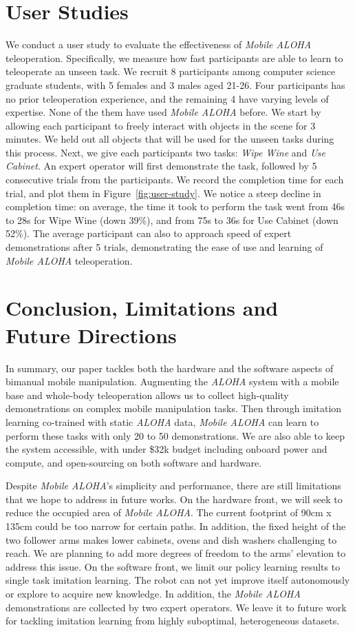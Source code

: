 \documentclass[11pt, a4paper, logo, twocolumn]{stanford}
\newcommand{\method}{\textit{Mobile ALOHA} }
\newcommand{\methodcomma}{\textit{Mobile ALOHA}}
\newcommand{\aloha}{\textit{ALOHA} }
\begin{document}
\section{User Studies}
We conduct a user study to evaluate the effectiveness of \method teleoperation. Specifically, we measure how fast participants are able to learn to teleoperate an unseen task.
We recruit 8 participants among computer science graduate students, with 5 females and 3 males aged 21-26. Four participants has no prior teleoperation experience, and the remaining 4 have varying levels of expertise. None of the them have used \method before.
We start by allowing each participant to freely interact with objects in the scene for 3 minutes. We held out all objects that will be used for the unseen tasks during this process.
Next, we give each participants two tasks: \textit{Wipe Wine} and \textit{Use Cabinet}. An expert operator will first demonstrate the task, followed by 5 consecutive trials from the participants. We record the completion time for each trial, and plot them in Figure~\ref{fig:user-study}.
We notice a steep decline in completion time: on average, the time it took to perform the task went from 46s to 28s for Wipe Wine (down 39\%), and from 75s to 36s for Use Cabinet (down 52\%). The average participant can also to approach speed of expert demonstrations after 5 trials, demonstrating the ease of use and learning
of \method teleoperation.

\section{Conclusion, Limitations and\\Future Directions}
In summary, our paper tackles both the hardware and the software aspects of bimanual mobile manipulation. 
Augmenting the \aloha system with a mobile base and whole-body teleoperation allows us to collect high-quality demonstrations on complex mobile manipulation tasks.
Then through imitation learning co-trained with static \aloha data, \method can learn to perform these tasks with only 20 to 50 demonstrations.
We are also able to keep the system accessible, with under \$32k budget including onboard power and compute, and open-sourcing on both software and hardware.

Despite \methodcomma's simplicity and performance, there are still limitations that we hope to address in future works. 
On the hardware front, we will seek to reduce the occupied area of \methodcomma. The current footprint of 90cm x 135cm could be too narrow for certain paths.
In addition, the fixed height of the two follower arms makes lower cabinets, ovens and dish washers challenging to reach.
We are planning to add more degrees of freedom to the arms' elevation to address this issue. 
On the software front, we limit our policy learning results to single task imitation learning. The robot can not yet improve itself autonomously or explore to acquire new knowledge.
In addition, the \method demonstrations are collected by two expert operators. We leave it to future work for tackling imitation learning from highly suboptimal, heterogeneous datasets.
\end{document}
